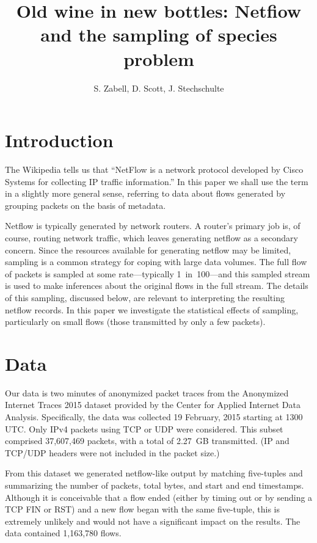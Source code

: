 \documentclass{paper}
\title{Old wine in new bottles: Netfiow and the sampling of species problem}
\author{S. Zabell, D. Scott, J. Stechschulte}
\begin{document}
\maketitle

\section{Introduction}
The Wikipedia tells us that ``NetFlow is a network protocol developed by Cisco
Systems for collecting IP traffic information.'' In this paper we shall use the
term in a slightly more general sense, referring to data about flows generated
by grouping packets on the basis of metadata.

Netflow is typically generated by network routers. A router's primary job is, of
course, routing network traffic, which leaves generating netflow as a secondary
concern. Since the resources available for generating netflow may be limited,
sampling is a common strategy for coping with large data volumes. The full flow
of packets is sampled at some rate---typically 1~in~100---and this sampled
stream is used to make inferences about the original flows in the full stream.
The details of this sampling, discussed below, are relevant to interpreting the
resulting netflow records. In this paper we investigate the statistical effects
of sampling, particularly on small flows (those transmitted by only a few
packets).

\section{Data}
Our data is two minutes of anonymized packet traces from the Anonymized
Internet Traces 2015 dataset provided by the Center for Applied Internet Data
Analysis. Specifically, the data was collected 19 February, 2015 starting at
1300 UTC\@. Only IPv4 packets using TCP or UDP were considered. This subset
comprised 37,607,469 packets, with a total of 2.27~GB transmitted. (IP and
TCP/UDP headers were not included in the packet size.)

From this dataset we generated netflow-like output by matching five-tuples and
summarizing the number of packets, total bytes, and start and end timestamps.
Although it is conceivable that a flow ended (either by timing out or by sending
a TCP FIN or RST) and a new flow began with the same five-tuple, this is
extremely unlikely and would not have a significant impact on the results. The
data contained 1,163,780 flows.
\end{document}
